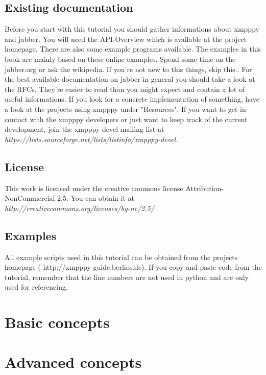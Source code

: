 \documentclass[a4paper,10pt]{report}
\begin{document}
\section{Existing documentation}
Before you start with this tutorial you should gather informations about xmpppy and jabber.
You will need the API-Overview which is available at the project homepage. There are also some example programs available. The examples in this book are mainly based on these online examples.
\newline
\newline
Spend some time on the jabber.org or ask the wikipedia. If you're not new to this things, skip this..
\newline
\newline
For the best available documentation on jabber in general you should take a look at the RFCs. They're easier to read than you might expect and contain a lot of useful informations.
\newline
\newline
If you look for a concrete implementation of something, have a look at the projects using xmpppy under "Resources".
\newline
\newline
If you want to get in contact with the xmpppy developers or just want to keep track of the current development, join the xmpppy-devel mailing list at \textit{https://lists.sourceforge.net/lists/listinfo/xmpppy-devel}.

\section{License}

This work is licensed under the creative commons license Attribution-NonCommercial 2.5.
You can obtain it at \textit{http://creativecommons.org/licenses/by-nc/2.5/}

\section{Examples}

All example scripts used in this tutorial can be obtained from the projects homepage ( http://xmpppy-guide.berlios.de).
\newline
If you copy and paste code from the tutorial, remember that the line numbers are not used in python
and are only used for referencing.





\chapter{Basic concepts}






\chapter{Advanced concepts}





\newpage
\end{document}
